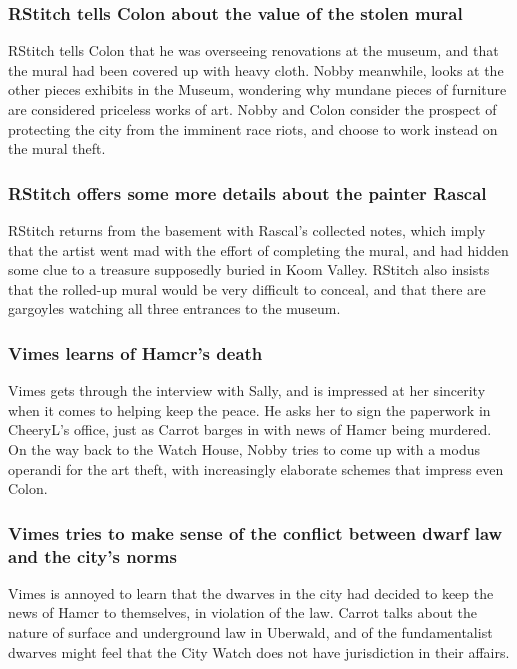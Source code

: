 \subsubsection{\Gls{RStitch} tells \Gls{Colon} about the value of the stolen mural}
\Gls{RStitch} tells \Gls{Colon} that he was overseeing renovations at the museum, and that the
mural had been covered up with heavy cloth. \Gls{Nobby} meanwhile, looks at the other pieces
exhibits in the Museum, wondering why mundane pieces of furniture are considered priceless works of
art. \Gls{Nobby} and \Gls{Colon} consider the prospect of protecting the city from the imminent race
riots, and choose to work instead on the mural theft.

\subsubsection{\Gls{RStitch} offers some more details about the painter \Gls{Rascal}}
\Gls{RStitch} returns from the basement with \Gls{Rascal}'s collected notes, which imply that
the artist went mad with the effort of completing the mural, and had hidden some clue to a treasure
supposedly buried in Koom Valley. \Gls{RStitch} also insists that the rolled-up mural would be
very difficult to conceal, and that there are gargoyles watching all three entrances to the museum.

\subsubsection{\Gls{Vimes} learns of \Gls{Hamcr}'s death}
\Gls{Vimes} gets through the interview with \Gls{Sally}, and is impressed at her sincerity when it
comes to helping keep the peace. He asks her to sign the paperwork in \Gls{CheeryL}'s office, just
as \Gls{Carrot} barges in with news of \Gls{Hamcr} being murdered. On the way back to the Watch
House, \Gls{Nobby} tries to come up with a modus operandi for the art theft, with increasingly
elaborate schemes that impress even \Gls{Colon}.

\subsubsection{\Gls{Vimes} tries to make sense of the conflict between dwarf law and the city's
    norms}
\Gls{Vimes} is annoyed to learn that the dwarves in the city had decided to keep the news of
\Gls{Hamcr} to themselves, in violation of the law. \Gls{Carrot} talks about the nature of
surface and underground law in Uberwald, and of the fundamentalist dwarves might feel that the
City Watch does not have jurisdiction in their affairs.

